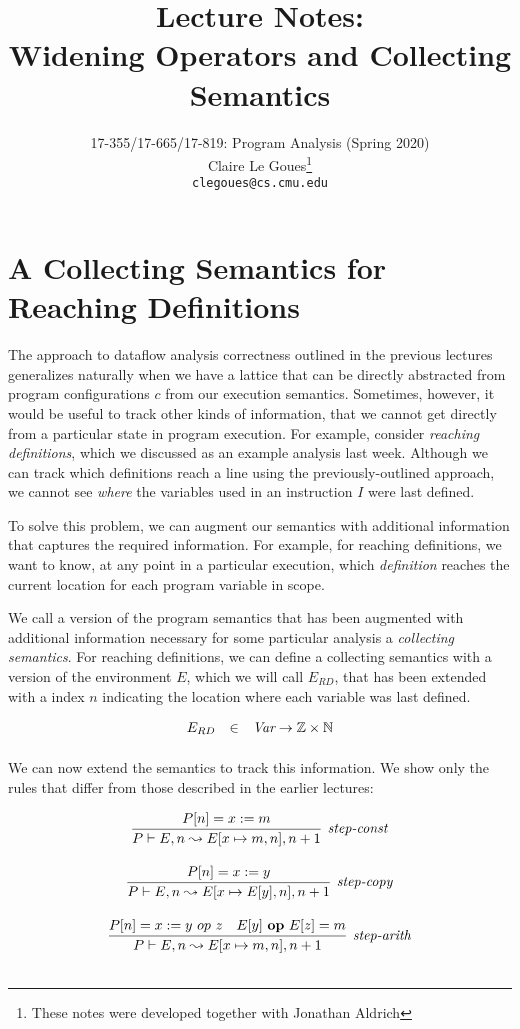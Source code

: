 \documentclass[11pt]{article}
\title{Lecture Notes:\\
		Widening Operators and Collecting Semantics}
\author{17-355/17-665/17-819: Program Analysis (Spring 2020)\\
        Claire Le Goues\footnote{These notes were developed together with Jonathan Aldrich}\\
		{\tt clegoues@cs.cmu.edu}}
\date{}
\begin{document}
\maketitle


\section{A Collecting Semantics for Reaching Definitions}

The approach to dataflow analysis correctness outlined in the previous lectures
generalizes naturally when we have a lattice that can be directly abstracted
from program configurations $c$ from our execution semantics.  Sometimes,
however, it would be useful to track other kinds of information, that we cannot
get directly from a particular state in program execution.  For example,
consider \emph{reaching definitions}, which we discussed as an example analysis
last week.  Although we can track which definitions reach a line using the
previously-outlined approach, we cannot see \emph{where} the variables used in
an instruction $I$ were last defined.

To solve this problem, we can augment our semantics with additional information
that captures the required information.  For example, for reaching definitions,
we want to know, at any point in a particular execution, which \emph{definition}
reaches the current location for each program variable in scope.

We call a version of the program semantics that has been augmented with
additional information necessary for some particular analysis a
\textit{collecting semantics}.  For reaching definitions, we can define a
collecting semantics with a version of the environment $E$, which we will call
$E_{RD}$, that has been extended with a index $n$ indicating the location where
each variable was last defined.

\[
\begin{array}{lll}

E_{RD} & \in & \textit{Var} \rightarrow \mathbb{Z} \times \mathbb{N} \\[1ex]

\end{array}
\]

We can now extend the semantics to track this information.  We show only the rules that differ from those described in the earlier lectures:

\[
\begin{array}{c}

\infer[\textit{step-const}]{P \vdash E,n \leadsto E[x \mapsto m,n],n+1}{P[n] = x := m}\\[3ex]

\infer[\textit{step-copy}]
	{P \vdash E,n \leadsto E[x \mapsto E[y],n],n+1}
	{P[n] = x := y}\\[3ex]
	
\infer[\textit{step-arith}]
	{P \vdash E,n \leadsto E[x \mapsto m,n],n+1}
	{P[n] = x := y ~op~ z & E[y] ~\mathbf{op}~ E[z] = m}\\[3ex]
	
\end{array}
\]
\end{document}
